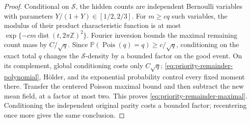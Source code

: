 \documentclass[11pt,letterpaper]{article}
\newcommand{\PP}{\mathbb P}\newcommand{\EE}{\mathbb E}
\begin{document}
\begin{proof}
Conditional on $\mathcal S$, the hidden counts are independent
Bernoulli variables with parameters $Y/(1+Y)\in[1/2,2/3]$.
For $m\ge cq$ such variables, the modulus of their product
characteristic function is at most
$\exp\{-cm\operatorname{dist}(t,2\pi\mathbb Z)^2\}$.
Fourier inversion bounds the maximal remaining count mass
by $C/\sqrt q$. Since $\PP(\operatorname{Pois}(q)=q)\ge c/\sqrt q$,
conditioning on the exact total $q$ changes the
$\mathcal S$-density by a bounded factor on the good event.
On its complement, global conditioning costs only $C\sqrt q$;
\eqref{eq:priority-remainder-polynomial}, H\"older, and its
exponential probability control every fixed moment there.
Transfer the centered Poisson maximal bound and then
subtract the new mean field, at a factor at most two.
This proves \eqref{eq:priority-remainder-maximal}.
Conditioning the independent original parity costs a bounded
factor; recentering once more gives the same conclusion.
\end{proof}
\end{document}
